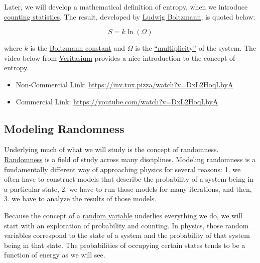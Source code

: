 Later, we will develop a mathematical definition of entropy, when we
introduce \href{https://en.wikipedia.org/wiki/Combinatorics}{counting
statistics}. The result, developed by
\href{https://en.wikipedia.org/wiki/Ludwig_Boltzmann}{Ludwig Boltzmann},
is quoted below:

\[S = k \ln(\Omega)\]

where \(k\) is the
\href{https://en.wikipedia.org/wiki/Boltzmann_constant}{Boltzmann
constant} and \(\Omega\) is the
\href{https://en.wikipedia.org/wiki/Multiplicity_(statistical_mechanics)}{``multiplicity''}
of the system. The video below from
\href{https://www.youtube.com/channel/UCHnyfMqiRRG1u-2MsSQLbXA}{Veritasium}
provides a nice introduction to the concept of entropy.

\href{https://inv.tux.pizza/watch?v=DxL2HoqLbyA}{\pandocbounded{\texttt{[image: https://markdown-videos-api.jorgenkh.no/youtube/DxL2HoqLbyA?width=720\&height=405]}}}

\begin{itemize}
\tightlist
\item
  Non-Commercial Link: \url{https://inv.tux.pizza/watch?v=DxL2HoqLbyA}
\item
  Commercial Link: \url{https://youtube.com/watch?v=DxL2HoqLbyA}
\end{itemize}

\subsection{Modeling Randomness}\label{modeling-randomness}

Underlying much of what we will study is the concept of randomness.
\href{https://en.wikipedia.org/wiki/Randomness}{Randomness} is a field
of study across many disciplines. Modeling randomness is a fundamentally
different way of approaching physics for several reasons: 1. we often
have to construct models that describe the probability of a system being
in a particular state, 2. we have to run those models for many
iterations, and then, 3. we have to analyze the results of those models.

Because the concept of a
\href{https://en.wikipedia.org/wiki/Random_variable}{random variable}
underlies everything we do, we will start with an exploration of
probability and counting. In physics, those random variables correspond
to the state of a system and the probability of that system being in
that state. The probabilities of occupying certain states tends to be a
function of energy as we will see.

